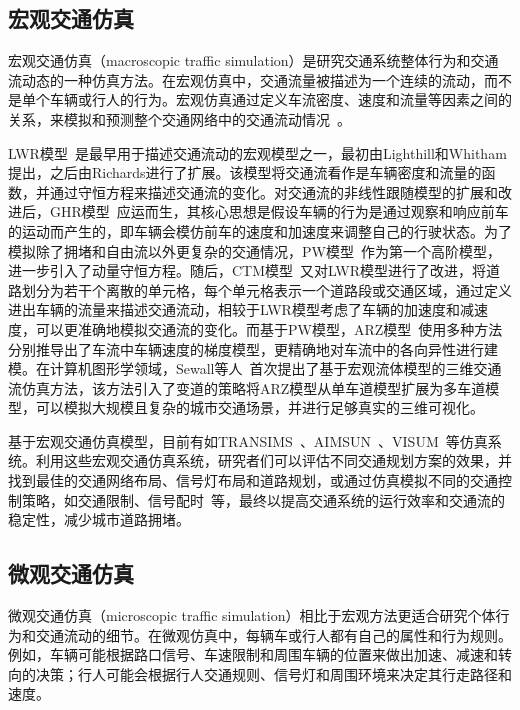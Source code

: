\subsection{宏观交通仿真}

宏观交通仿真（macroscopic traffic simulation）是研究交通系统整体行为和交通流动态的一种仿真方法。在宏观仿真中，交通流量被描述为一个连续的流动，而不是单个车辆或行人的行为。宏观仿真通过定义车流密度、速度和流量等因素之间的关系，来模拟和预测整个交通网络中的交通流动情况~\cite{wang2017survey, chao2020survey}。

LWR模型~\cite{lighthill1955kinematic}是最早用于描述交通流动的宏观模型之一，最初由Lighthill和Whitham提出，之后由Richards进行了扩展。该模型将交通流看作是车辆密度和流量的函数，并通过守恒方程来描述交通流的变化。对交通流的非线性跟随模型的扩展和改进后，GHR模型~\cite{gazis1961nonlinear}应运而生，其核心思想是假设车辆的行为是通过观察和响应前车的运动而产生的，即车辆会模仿前车的速度和加速度来调整自己的行驶状态。为了模拟除了拥堵和自由流以外更复杂的交通情况，PW模型~\cite{payne1971model, whitham1974linear}作为第一个高阶模型，进一步引入了动量守恒方程。随后，CTM模型~\cite{daganzo1994cell}又对LWR模型进行了改进，将道路划分为若干个离散的单元格，每个单元格表示一个道路段或交通区域，通过定义进出车辆的流量来描述交通流动，相较于LWR模型考虑了车辆的加速度和减速度，可以更准确地模拟交通流的变化。而基于PW模型，ARZ模型~\cite{aw2000resurrection, zhang2002non}使用多种方法分别推导出了车流中车辆速度的梯度模型，更精确地对车流中的各向异性进行建模。在计算机图形学领域，Sewall等人~\cite{sewall2010continuum}首次提出了基于宏观流体模型的三维交通流仿真方法，该方法引入了变道的策略将ARZ模型从单车道模型扩展为多车道模型，可以模拟大规模且复杂的城市交通场景，并进行足够真实的三维可视化。

基于宏观交通仿真模型，目前有如TRANSIMS~\cite{smith1995transims}、AIMSUN~\cite{barcelo2005aimsun}、VISUM~\cite{jacyna2017visum}等仿真系统。利用这些宏观交通仿真系统，研究者们可以评估不同交通规划方案的效果，并找到最佳的交通网络布局、信号灯布局和道路规划，或通过仿真模拟不同的交通控制策略，如交通限制、信号配时~\cite{teklu2007signals}等，最终以提高交通系统的运行效率和交通流的稳定性，减少城市道路拥堵。


\subsection{微观交通仿真}

微观交通仿真（microscopic traffic simulation）相比于宏观方法更适合研究个体行为和交通流动的细节。在微观仿真中，每辆车或行人都有自己的属性和行为规则。例如，车辆可能根据路口信号、车速限制和周围车辆的位置来做出加速、减速和转向的决策；行人可能会根据行人交通规则、信号灯和周围环境来决定其行走路径和速度。

